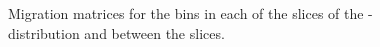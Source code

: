 \begin{figure}[htb]
\caption{Migration matrices for the \dPhill bins in each of the \mFourL slices of the \dPhill-\mFourL distribution and between the slices.\label{fig:dphimat}}
 \end{figure}

